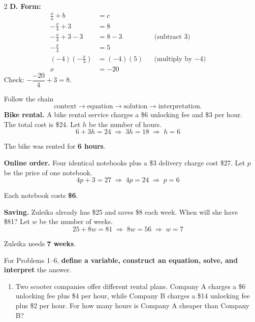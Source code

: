 \begin{multicols}{2}
		\textbf{D. Form:}
		\vspace{-7mm}
		\begin{align*}
			\frac{x}{a}+b&=c \\
			-\frac{x}{4}+3&=8 \\
			-\frac{x}{4}+3-3&=8-3 &&\text{(subtract 3)}\\
			-\frac{x}{4}&=5\\
			(-4)\left(-\frac{x}{4}\right)&=(-4)(5) &&\text{(multiply by $-4$)}\\
			x&=-20
		\end{align*}
		\vspace{-4mm}
		Check: $-\dfrac{-20}{4}+3=8$.
		
		\newpage
		
		Follow the chain
		\[
		\text{context}\longrightarrow\text{equation}\longrightarrow
		\text{solution}\longrightarrow\text{interpretation}.
		\]
		\textbf{Bike rental.} A bike rental service charges a \$6 unlocking fee and
		\$3 per hour. The total cost is \$24. Let $h$ be the number of hours.\vspace{-2mm}
		\[
		6+3h=24\;\Longrightarrow\;3h=18\;\Longrightarrow\;h=6
		\]
		
		\vspace{-2mm}
		The bike was rented for \textbf{6 hours}.
		
		\textbf{Online order.} Four identical notebooks plus a \$3 delivery charge cost
		\$27. Let $p$ be the price of one notebook.\vspace{-2mm}
		\[
		4p+3=27\;\Longrightarrow\;4p=24\;\Longrightarrow\;p=6
		\]
		
		\vspace{-2mm}
		Each notebook costs \textbf{\$6}.
		
		\textbf{Saving.} Zuleika already has \$25 and saves \$8 each week. When will she
		have \$81? Let $w$ be the number of weeks.\vspace{-2mm}
		\[
		25+8w=81\;\Longrightarrow\;8w=56\;\Longrightarrow\;w=7
		\]
		
		\vspace{-2mm}
		Zuleika needs \textbf{7 weeks}.
		
		
		
		For Problems 1--6, \textbf{define a variable, construct an equation, solve,
			and interpret} the answer.
		

		\begin{enumerate}[label=\textbf{\arabic*.}]
			\item Two scooter companies offer different rental plans. Company A charges
			a \$6 unlocking fee plus \$4 per hour, while Company B charges a \$14
			unlocking fee plus \$2 per hour. For how many hours is Company A cheaper
			than Company B?
			

\end{enumerate}
\end{multicols}
